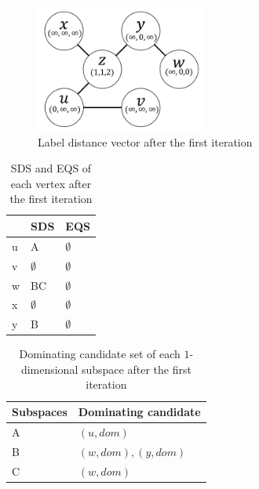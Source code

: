 \begin{figure}[H]
    \centering
    \includegraphics[width=0.5\textwidth]{figs/graph_example_1}
    \caption{Label distance vector after the first iteration}
    \label{fig:cand_step1}
    
\end{figure}

\begin{table}[H]
    \centering
    \begin{tabular}{|l|l|l|}
    \hline
      & SDS         & EQS         \\ \hline
    u & A           & $\emptyset$ \\ \hline
    v & $\emptyset$ & $\emptyset$ \\ \hline
    w & BC          & $\emptyset$ \\ \hline
    x & $\emptyset$ & $\emptyset$ \\ \hline
    y & B           & $\emptyset$ \\ \hline
    \end{tabular}
    \caption{SDS and EQS of each vertex after the first iteration}
    \label{tab:sds_step1}
\end{table}

\begin{table}[H]
    \centering
    \begin{tabular}{|l|l|}
    \hline
    Subspaces & Dominating candidate \\ \hline
    A         & $(u, dom)$            \\ \hline
    B         & $(w, dom), (y, dom)$            \\ \hline
    C         & $(w, dom)$            \\ \hline
    \end{tabular}
    \caption{Dominating candidate set of each $1$-dimensional subspace after the first iteration}
    \label{tab:cand_set_step1}
\end{table}

